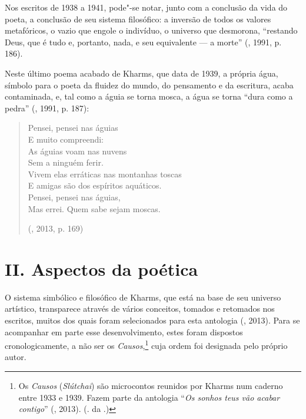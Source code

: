 Nos escritos de 1938 a 1941, pode"-se notar, junto com a conclusão
da vida do poeta, a conclusão de seu sistema filosófico: a inversão
de todos os valores metafóricos, o vazio que engole o indivíduo, o
universo que desmorona, ``restando Deus, que é tudo e, portanto,
nada, e seu equivalente --- a morte'' (, 1991, p. 186).

Neste último poema acabado de Kharms, que data de 1939, a própria
água, símbolo para o poeta da fluidez do mundo, do pensamento e da
escritura, acaba contaminada, e, tal como a águia se torna mosca,
a água se torna ``dura como a pedra'' (, 1991, p.
187): 

\begin{verse}
Pensei, pensei nas águias \\
E muito compreendi: \\
As águias voam nas nuvens \\
Sem a ninguém ferir. \\
Vivem elas erráticas nas montanhas toscas \\
E amigas são dos espíritos aquáticos. \\
Pensei, pensei nas águias, \\
Mas errei. Quem sabe sejam moscas.

(, 2013, p. 169)

\end{verse}

\section{\uppercase{II}. \uppercase{A}spectos da poética}

O sistema simbólico e filosófico de Kharms, que está na base de seu
universo artístico, transparece através de
vários conceitos, tomados e retomados nos escritos, muitos dos quais foram selecionados
 para esta antologia (, 2013). Para se acompanhar em
 parte esse desenvolvimento, estes foram dispostos cronologicamente,
 a não ser os \emph{Causos},\footnote{Os \emph{Causos} (\emph{Slútchai}) são microcontos reunidos por Kharms num caderno entre 1933 e 1939. Fazem parte da antologia ``\emph{Os sonhos teus vão acabar contigo}'' (, 2013). (. da .)} cuja ordem foi designada pelo próprio
 autor.

